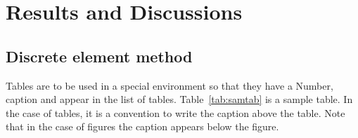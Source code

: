 \chapter{Results and Discussions}


\section{Discrete element method}

Tables are to be used in a special environment so that they have a
Number, caption and appear in the list of tables.
Table~\ref{tab:samtab} is a sample table. In the case of tables, it is
a convention to write the caption above the table.  Note that in the
case of figures the caption appears below the figure.


